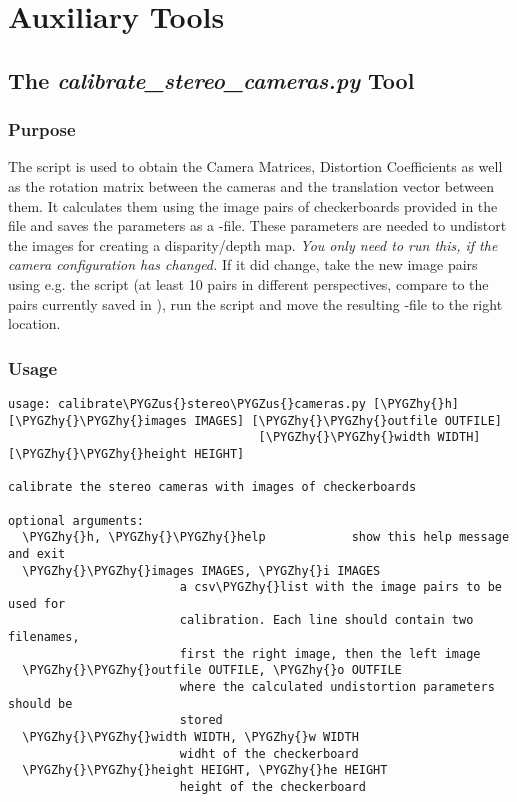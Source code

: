 \documentclass[a4paper,10pt,openany,oneside]{sphinxmanual}
\def\PYGZus{\char`\_}
\def\PYGZhy{\char`\-}
\begin{document}
\chapter{Auxiliary Tools}
\label{index:auxiliary-tools}

\section{The \emph{calibrate\_stereo\_cameras.py} Tool}
\label{index:the-calibrate-stereo-cameras-py-tool}

\subsection{Purpose}
\label{index:purpose}
The  script is used to obtain the
Camera Matrices, Distortion Coefficients as well as the rotation matrix between
the cameras and the translation vector between them. It calculates them using
the image pairs of checkerboards provided in the  file and saves
the parameters as a -file. These parameters are needed to
undistort the images for creating a disparity/depth map. \emph{You only need
to run this, if the camera configuration has changed.} If it did change, take
the new image pairs using e.g. the  script (at least
10 pairs in different perspectives, compare to the pairs currently saved in
), run the script and move the resulting
-file to the right location.


\subsection{Usage}
\label{index:usage}
\begin{Verbatim}[commandchars=\\\{\}]
usage: calibrate\PYGZus{}stereo\PYGZus{}cameras.py [\PYGZhy{}h] [\PYGZhy{}\PYGZhy{}images IMAGES] [\PYGZhy{}\PYGZhy{}outfile OUTFILE]
                                   [\PYGZhy{}\PYGZhy{}width WIDTH] [\PYGZhy{}\PYGZhy{}height HEIGHT]

calibrate the stereo cameras with images of checkerboards

optional arguments:
  \PYGZhy{}h, \PYGZhy{}\PYGZhy{}help            show this help message and exit
  \PYGZhy{}\PYGZhy{}images IMAGES, \PYGZhy{}i IMAGES
                        a csv\PYGZhy{}list with the image pairs to be used for
                        calibration. Each line should contain two filenames,
                        first the right image, then the left image
  \PYGZhy{}\PYGZhy{}outfile OUTFILE, \PYGZhy{}o OUTFILE
                        where the calculated undistortion parameters should be
                        stored
  \PYGZhy{}\PYGZhy{}width WIDTH, \PYGZhy{}w WIDTH
                        widht of the checkerboard
  \PYGZhy{}\PYGZhy{}height HEIGHT, \PYGZhy{}he HEIGHT
                        height of the checkerboard
\end{Verbatim}
\end{document}
